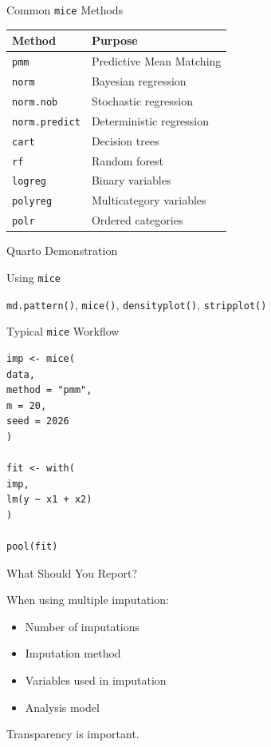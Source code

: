 \documentclass{beamer}
\begin{document}
\begin{frame}{Common \texttt{mice} Methods}

\begin{tabular}{ll}
\textbf{Method} & \textbf{Purpose} \\
\hline
\texttt{pmm} & Predictive Mean Matching \\
\texttt{norm} & Bayesian regression \\
\texttt{norm.nob} & Stochastic regression \\
\texttt{norm.predict} & Deterministic regression \\
\texttt{cart} & Decision trees \\
\texttt{rf} & Random forest \\
\texttt{logreg} & Binary variables \\
\texttt{polyreg} & Multicategory variables \\
\texttt{polr} & Ordered categories \\
\end{tabular}
\end{frame}

\begin{frame}[plain]
\centering
\vfill
{\Huge Quarto Demonstration}

\vspace{0.5cm}

{\Large Using \texttt{mice}}

\vspace{0.5cm}

\texttt{md.pattern()}, \texttt{mice()},
\texttt{densityplot()}, \texttt{stripplot()}

\vfill
\end{frame}

\begin{frame}[fragile]{Typical \texttt{mice} Workflow}

\begin{verbatim}
imp <- mice(
data,
method = "pmm",
m = 20,
seed = 2026
)

fit <- with(
imp,
lm(y ~ x1 + x2)
)

pool(fit)
\end{verbatim}
\end{frame}

\begin{frame}{What Should You Report?}

When using multiple imputation:

\begin{itemize}
\item Number of imputations
\item Imputation method
\item Variables used in imputation
\item Analysis model
\end{itemize}

\vspace{0.5cm}

Transparency is important.
\end{frame}
\end{document}
